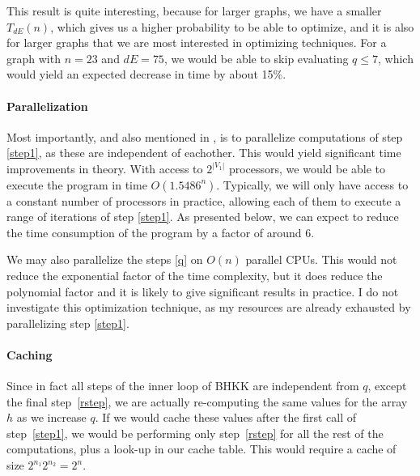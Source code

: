 \documentclass[a4paper]{article}
\begin{document}
This result is quite interesting, because for larger graphs, we have a smaller $T_{dE}(n)$, which gives us a higher probability to be able to optimize, and it is also for larger graphs that we are most interested in optimizing techniques. For a graph with $n=23$ and $dE = 75$, we would be able to skip evaluating $q\leq7$, which would yield an expected decrease in time by about 15\%\footnotemark. %


\paragraph{Parallelization} Most importantly, and also mentioned in \cite{cov_pack}, is to parallelize computations of step \ref{step1}, as these are independent of eachother. This would yield significant time improvements in theory. With access to $2^{|V_1|}$ processors, we would be able to execute the program in time $O(1.5486^n)$. Typically, we will only have access to a constant number of processors in practice, allowing each of them to execute a range of iterations of step \ref{step1}. As presented below, we can expect to reduce the time consumption of the program by a factor of around 6. %

We may also parallelize the steps \ref{q} on $O(n)$ parallel CPUs. This would not reduce the exponential factor of the time complexity, but it does reduce the polynomial factor and it is likely to give significant results in practice. I do not investigate this optimization technique, as my resources are already exhausted by parallelizing step \ref{step1}.

\paragraph{Caching} Since in fact all steps of the inner loop of BHKK are independent from $q$, except the final step~\ref{rstep}, we are actually re-computing the same values for the array $h$ as we increase $q$. If we would cache these values after the first call of step~\ref{step1}, we would be performing only step~\ref{rstep} for all the rest of the computations, plus a look-up in our cache table. This would require a cache of size $2^{n_1} 2^{n_2} = 2^n$.
\end{document}
